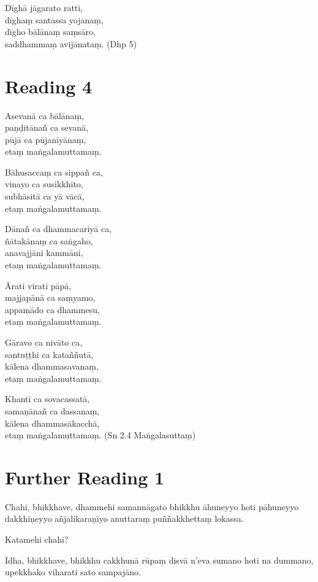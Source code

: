 Dīghā jāgarato ratti,\\
dīghaṃ santassa yojanaṃ,\\
dīgho bālānaṃ saṃsāro,\\
saddhammaṃ avijānataṃ. (Dhp 5)

\section*{Reading 4}

Asevanā ca bālānaṃ,\\
paṇḍitānañ ca sevanā,\\
pūjā ca pūjanīyānaṃ,\\
etaṃ maṅgalamuttamaṃ.

Bāhusaccaṃ ca sippañ ca,\\
vinayo ca susikkhito,\\
subhāsitā ca yā vācā,\\
etaṃ maṅgalamuttamaṃ.

Dānañ ca dhammacariyā ca,\\
ñātakānaṃ ca saṅgaho,\\
anavajjāni kammāni,\\
etaṃ maṅgalamuttamaṃ.

Ārati virati pāpā,\\
majjapānā ca saṃyamo,\\
appamādo ca dhammesu,\\
etaṃ maṅgalamuttamaṃ.

Gāravo ca nivāto ca,\\
santuṭṭhi ca kataññutā,\\
kālena dhammasavanaṃ,\\
etaṃ maṅgalamuttamaṃ.

Khantī ca sovacassatā,\\
samaṇānañ ca dassanaṃ,\\
kālena dhammasākacchā,\\
etaṃ maṅgalamuttamaṃ. (Sn 2.4 Maṅgalasuttaṃ)

\section*{Further Reading 1}

Chahi, bhikkhave, dhammehi samannāgato bhikkhu āhuneyyo hoti pāhuneyyo dakkhiṇeyyo añjalikaraṇīyo anuttaraṃ puññakkhettaṃ lokassa.

Katamehi chahi?

Idha, bhikkhave, bhikkhu cakkhunā rūpaṃ disvā n’eva sumano hoti na dummano, upekkhako viharati sato sampajāno.

